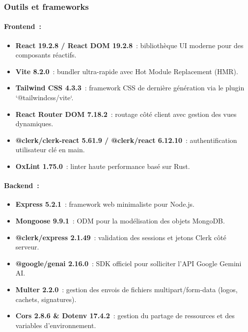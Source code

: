 \documentclass[a4paper,12pt]{extarticle}
\begin{document}
\subsubsection{Outils et frameworks}

\paragraph{Frontend~:}
\begin{itemize}
  \item \textbf{React 19.2.8 / React DOM 19.2.8}~: bibliothèque UI moderne pour des composants réactifs.
  \item \textbf{Vite 8.2.0}~: bundler ultra-rapide avec Hot Module Replacement (HMR).
  \item \textbf{Tailwind CSS 4.3.3}~: framework CSS de dernière génération via le plugin `@tailwindcss/vite`.
  \item \textbf{React Router DOM 7.18.2}~: routage côté client avec gestion des vues dynamiques.
  \item \textbf{@clerk/clerk-react 5.61.9 / @clerk/react 6.12.10}~: authentification utilisateur clé en main.
  \item \textbf{OxLint 1.75.0}~: linter haute performance basé sur Rust.
\end{itemize}

\paragraph{Backend~:}
\begin{itemize}
  \item \textbf{Express 5.2.1}~: framework web minimaliste pour Node.js.
  \item \textbf{Mongoose 9.9.1}~: ODM pour la modélisation des objets MongoDB.
  \item \textbf{@clerk/express 2.1.49}~: validation des sessions et jetons Clerk côté serveur.
  \item \textbf{@google/genai 2.16.0}~: SDK officiel pour solliciter l'API Google Gemini AI.
  \item \textbf{Multer 2.2.0}~: gestion des envois de fichiers multipart/form-data (logos, cachets, signatures).
  \item \textbf{Cors 2.8.6 \& Dotenv 17.4.2}~: gestion du partage de ressources et des variables d'environnement.
\end{itemize}
\end{document}
